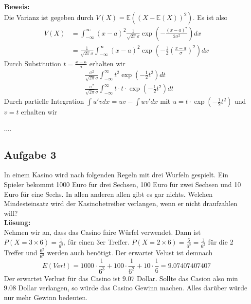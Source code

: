\documentclass[11pt,a4paper,ngerman]{article}
\begin{document}
\textbf{Beweis:}\\
Die Varianz ist gegeben durch $V(X) = \mathbb{E}((X - \mathbb{E}(X))^2)$.
Es ist also
\begin{equation*}\begin{split}
V(X) &= \int_{-\infty}^{\infty} (x-a)^2 \frac{1}{\sqrt{2 \pi} \sigma} \exp\left(- \frac{(x-a)^2}{2\sigma^2} \right) dx \\
&=\frac{1}{\sqrt{2 \pi} \sigma}  \int_{-\infty}^{\infty} (x-a)^2  \exp\left(- \frac{1}{2} \left(  \frac{x-a}{\sigma} \right)^2 \right) dx 
\end{split}\end{equation*}
Durch Substitution $t = \frac{x-a}{\sigma}$ erhalten wir
\begin{equation*}\begin{split}
& \frac{\sigma^2}{\sqrt{2 \pi} \sigma}  \int_{-\infty}^{\infty} t^2  \exp\left(- \frac{1}{2} t^2 \right) dt \\
& \frac{\sigma^2}{\sqrt{2 \pi} \sigma}  \int_{-\infty}^{\infty} t \cdot t \cdot \exp\left(- \frac{1}{2} t^2 \right) dt
\end{split}\end{equation*}
Durch partielle Integration $\int u' v dx = u v - \int u v' dx$ mit $u =  t \cdot \exp\left(- \frac{1}{2} t^2 \right)$ und $ v = t$ erhalten wir

....

\subsection*{Aufgabe 3}

In einem Kasino wird nach folgenden Regeln mit drei Wurfeln gespielt. Ein Spieler
bekommt 1000 Euro fur drei Sechsen, 100 Euro für zwei Sechsen und 10 Euro für
eine Sechs. In allen anderen allen gibt es gar nichts. Welchen Mindesteinsatz wird
der Kasinobetreiber verlangen, wenn er nicht draufzahlen will?\\

\textbf{Lösung:}\\

Nehmen wir an, dass das Casino faire Würfel verwendet. Dann ist
$P( X = 3\times6) = \frac{1}{6^3}$, für einen 3er Treffer. $P( X = 2 \times 6) = \frac{6}{6^3} = \frac{1}{6^2}$ für
die 2 Treffer und $\frac{6^2}{6^3}$ werden auch benötigt. Der erwartet Velust ist demnach
\[
    E(Verl) = 1000 \cdot \frac{1}{6^3} + 100 \cdot \frac{1}{6^2} + 10 \cdot \frac{1}{6} = 9.07407407407
\]
Der erwartet Verlust für das Casino ist $9.07$ Dollar. Sollte das Casion also min $9.08$ Dollar verlangen, so
würde das Casino Gewinn machen. Alles darüber würde nur mehr Gewinn bedeuten.
\end{document}
